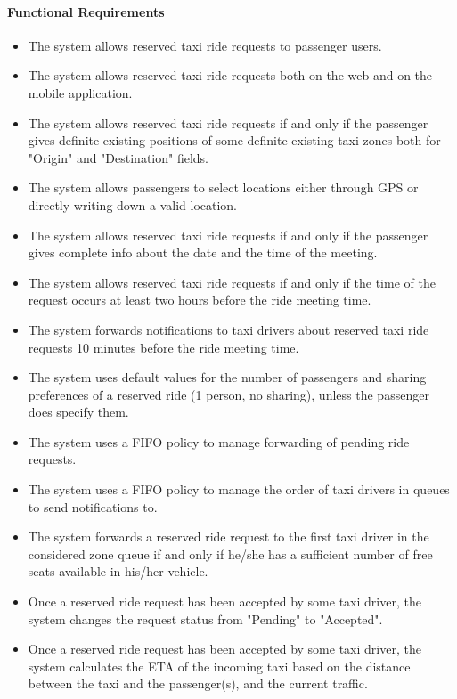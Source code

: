	\paragraph{Functional Requirements}
		\begin{itemize}
			\item The system allows reserved taxi ride requests to passenger users.
			\item The system allows reserved taxi ride requests both on the web and on the mobile application.
			\item The system allows reserved taxi ride requests if and only if the passenger gives definite existing positions of some definite existing taxi zones both for "Origin" and "Destination" fields.
			\item The system allows passengers to select locations either through GPS or directly writing down a valid location.
			\item The system allows reserved taxi ride requests if and only if the passenger gives complete info about the date and the time of the meeting.
			\item The system allows reserved taxi ride requests if and only if the time of the request occurs at least two hours before the ride meeting time.
			\item The system forwards notifications to taxi drivers about reserved taxi ride requests 10 minutes before the ride meeting time.
			\item The system uses default values for the number of passengers and sharing preferences of a reserved ride (1 person, no sharing), unless the passenger does specify them.
			\item The system uses a FIFO policy to manage forwarding of pending ride requests.
			\item The system uses a FIFO policy to manage the order of taxi drivers in queues to send notifications to.
			\item The system forwards a reserved ride request to the first taxi driver in the considered zone queue if and only if he/she has a sufficient number of free seats available in his/her vehicle.
			\item Once a reserved ride request has been accepted by some taxi driver, the system changes the request status from "Pending" to "Accepted".
			\item Once a reserved ride request has been accepted by some taxi driver, the system calculates the ETA of the incoming taxi based on the distance between the taxi and the passenger(s), and the current traffic.

\end{itemize}

